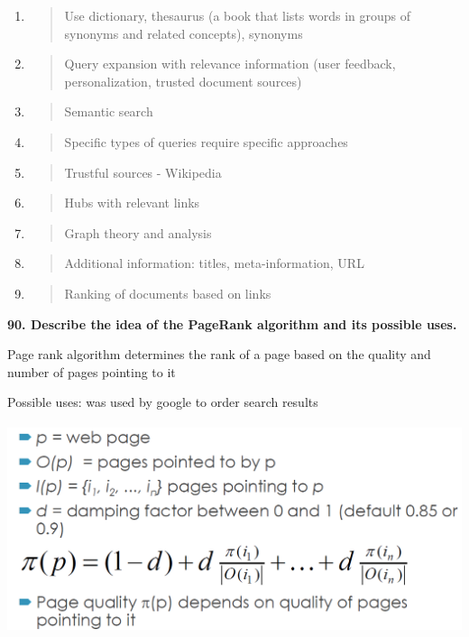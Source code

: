 \begin{enumerate}
\def\labelenumi{\arabic{enumi}.}
\item
  \begin{quote}
  Use dictionary, thesaurus (a book that lists words in groups of
  synonyms and related concepts), synonyms
  \end{quote}
\item
  \begin{quote}
  Query expansion with relevance information (user feedback,
  personalization, trusted document sources)
  \end{quote}
\item
  \begin{quote}
  Semantic search
  \end{quote}
\item
  \begin{quote}
  Specific types of queries require specific approaches
  \end{quote}
\item
  \begin{quote}
  Trustful sources - Wikipedia
  \end{quote}
\item
  \begin{quote}
  Hubs with relevant links
  \end{quote}
\item
  \begin{quote}
  Graph theory and analysis
  \end{quote}
\item
  \begin{quote}
  Additional information: titles, meta-information, URL
  \end{quote}
\item
  \begin{quote}
  Ranking of documents based on links
  \end{quote}
\end{enumerate}

\textbf{90. Describe the idea of the PageRank algorithm and its possible
uses.}

Page rank algorithm determines the rank of a page based on the quality
and number of pages pointing to it

Possible uses: was used by google to order search results

\includegraphics[width=5.42188in,height=2.41372in]{media/image2.png}

